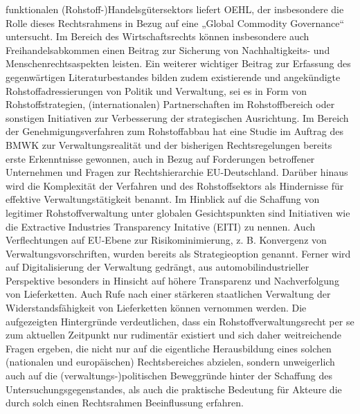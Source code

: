\documentclass[12pt,a4paper,oneside]{book} %
\begin{document}
funktionalen (Rohstoff-)Handelsgütersektors liefert OEHL, der insbesondere die Rolle dieses Rechtsrahmens in Bezug auf eine „Global Commodity Governance“ untersucht.\autocite{oehl_sustainable_2022} Im Bereich des Wirtschaftsrechts können insbesondere auch Freihandelsabkommen einen Beitrag zur Sicherung von Nachhaltigkeits- und Menschenrechtsaspekten leisten.\autocite[268]{priebe_lithiumabbau_2023}
Ein weiterer wichtiger Beitrag zur Erfassung des gegenwärtigen Literaturbestandes bilden zudem existierende und angekündigte Rohstoffadressierungen von Politik und Verwaltung, sei es in Form von Rohstoffstrategien, (internationalen) Partnerschaften im Rohstoffbereich oder sonstigen Initiativen zur Verbesserung der strategischen Ausrichtung. Im Bereich der Genehmigungsverfahren zum Rohstoffabbau hat eine Studie im Auftrag des BMWK\autocite{pavel_genehmigungsverfahren_2022} zur Verwaltungsrealität und der bisherigen Rechtsregelungen bereits erste Erkenntnisse gewonnen, auch in Bezug auf Forderungen betroffener Unternehmen und Fragen zur Rechtshierarchie EU-Deutschland. Darüber hinaus wird die Komplexität der Verfahren und des Rohstoffsektors als Hindernisse für effektive Verwaltungstätigkeit benannt. Im Hinblick auf die Schaffung von legitimer Rohstoffverwaltung unter globalen Gesichtspunkten sind Initiativen wie die Extractive Industries Transparency Initative (EITI) zu nennen.\autocite{feil_rohstoffkonflikte_2011} Auch Verflechtungen auf EU-Ebene zur Risikominimierung, z. B. Konvergenz von Verwaltungsvorschriften, wurden bereits als Strategieoption genannt.\autocite[47]{feil_rohstoffkonflikte_2011} Ferner wird auf Digitalisierung der Verwaltung gedrängt, aus automobilindustrieller Perspektive besonders in Hinsicht auf höhere Transparenz und Nachverfolgung von Lieferketten.\autocite[41]{kagermann_resilienz_2021} Auch Rufe nach einer stärkeren staatlichen Verwaltung der Widerstandsfähigkeit von Lieferketten können vernommen werden.\autocite{mortsiefer_autobauer_2022}
Die aufgezeigten Hintergründe verdeutlichen, dass ein Rohstoffverwaltungsrecht per se zum aktuellen Zeitpunkt nur rudimentär existiert und sich daher weitreichende Fragen ergeben, die nicht nur auf die eigentliche Herausbildung eines solchen (nationalen und europäischen) Rechtsbereiches abzielen, sondern unweigerlich auch auf die (verwaltungs-)politischen Beweggründe hinter der Schaffung des Untersuchungsgegenstandes, als auch die praktische Bedeutung für Akteure die durch solch einen Rechtsrahmen Beeinflussung erfahren.
\end{document}
